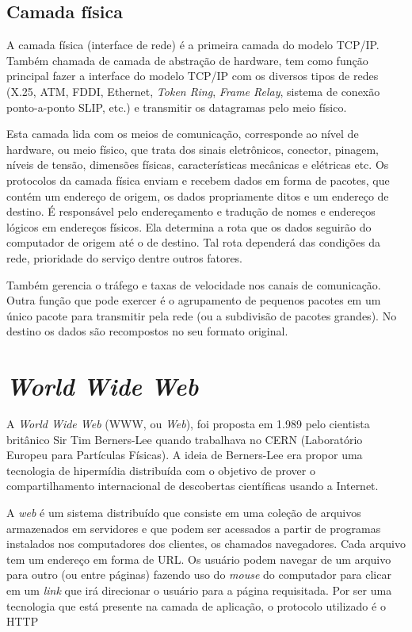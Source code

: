 \subsection{Camada física}

A camada física (interface de rede) é a primeira camada do modelo TCP/IP. 
Também chamada de camada de abstração de hardware, tem como função principal 
fazer a interface do modelo TCP/IP com os diversos tipos de redes (X.25, ATM, 
FDDI, Ethernet, \textit{Token Ring}, \textit{Frame Relay}, sistema de conexão 
ponto-a-ponto SLIP, etc.) e transmitir os datagramas pelo meio físico.

Esta camada lida com os meios de comunicação, corresponde ao nível de hardware, 
ou meio físico, que trata dos sinais eletrônicos, conector, pinagem, níveis de 
tensão, dimensões físicas, características mecânicas e elétricas etc. Os 
protocolos da camada física enviam e recebem dados em forma de pacotes, que 
contém um endereço de origem, os dados propriamente ditos e um endereço de 
destino. É responsável pelo endereçamento e tradução de nomes e endereços 
lógicos em endereços físicos. Ela determina a rota que os dados seguirão do 
computador de origem até o de destino. Tal rota dependerá das condições da 
rede, prioridade do serviço dentre outros fatores.

Também gerencia o tráfego e taxas de velocidade nos canais de comunicação. 
Outra função que pode exercer é o agrupamento de pequenos pacotes em um único 
pacote para transmitir pela rede (ou a subdivisão de pacotes grandes). No 
destino os dados são recompostos no seu formato original.

\section{\textit{World Wide Web}}

A \textit{World Wide Web} (WWW, ou \textit{Web}), foi proposta em 1.989 pelo 
cientista britânico Sir Tim Berners-Lee quando trabalhava no CERN (Laboratório 
Europeu para Partículas Físicas). A ideia de Berners-Lee era propor uma 
tecnologia de hipermídia distribuída com o objetivo de prover o 
compartilhamento internacional de descobertas científicas usando a Internet.

A \textit{web} é um sistema distribuído que consiste em uma coleção de 
arquivos armazenados em servidores e que podem ser acessados a partir de 
programas instalados nos computadores dos clientes, os chamados navegadores. 
Cada arquivo tem um endereço em forma de URL. Os usuário podem navegar de um 
arquivo para outro (ou entre páginas) fazendo uso do \textit{mouse} do 
computador para clicar em um \textit{link} que irá direcionar o usuário para a 
página requisitada. Por ser uma tecnologia que está presente na camada de 
aplicação, o protocolo utilizado é o HTTP

